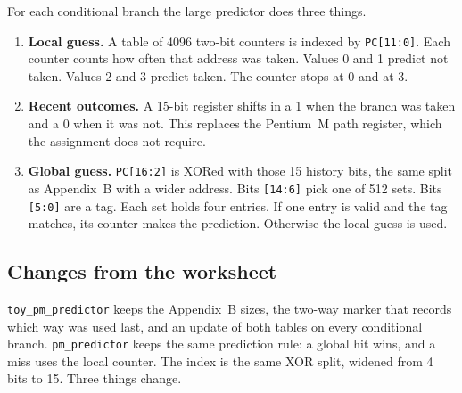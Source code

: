\documentclass[11pt]{article}
\begin{document}
For each conditional branch the large predictor does three things.

\begin{enumerate}
  \item \textbf{Local guess.} A table of 4096 two-bit counters is indexed by
        \texttt{PC[11:0]}. Each counter counts how often that address was
        taken. Values 0 and 1 predict not taken. Values 2 and 3 predict
        taken. The counter stops at 0 and at 3.
  \item \textbf{Recent outcomes.} A 15-bit register shifts in a 1 when the
        branch was taken and a 0 when it was not. This replaces the Pentium~M
        path register, which the assignment does not require.
  \item \textbf{Global guess.} \texttt{PC[16:2]} is XORed with those 15
        history bits, the same split as Appendix~B with a wider address.
        Bits \texttt{[14:6]} pick one of 512 sets. Bits \texttt{[5:0]} are a
        tag. Each set holds four entries. If one entry is valid and the tag
        matches, its counter makes the prediction. Otherwise the local guess
        is used.
\end{enumerate}

\subsection{Changes from the worksheet}

\texttt{toy\_pm\_predictor} keeps the Appendix~B sizes, the two-way marker
that records which way was used last, and an update of both tables on every
conditional branch. \texttt{pm\_predictor} keeps the same prediction rule: a
global hit wins, and a miss uses the local counter. The index is the same
XOR split, widened from 4 bits to 15. Three things change.
\end{document}
